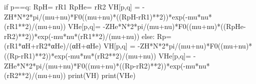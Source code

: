 \documentclass[
  letterpaper,
  DIV=11,
  numbers=noendperiod]{scrreprt}
\newenvironment{Shaded}{\begin{snugshade}}{\end{snugshade}}
\newcommand{\BuiltInTok}[1]{\textcolor[rgb]{0.00,0.23,0.31}{#1}}
\newcommand{\ControlFlowTok}[1]{\textcolor[rgb]{0.00,0.23,0.31}{#1}}
\newcommand{\DecValTok}[1]{\textcolor[rgb]{0.68,0.00,0.00}{#1}}
\newcommand{\NormalTok}[1]{\textcolor[rgb]{0.00,0.23,0.31}{#1}}
\newcommand{\OperatorTok}[1]{\textcolor[rgb]{0.37,0.37,0.37}{#1}}
\begin{document}
\begin{Shaded}
\begin{Highlighting}[]
        \ControlFlowTok{if}\NormalTok{ p}\OperatorTok{==}\NormalTok{q:}
\NormalTok{            RpH}\OperatorTok{=}\NormalTok{ rR1}
\NormalTok{            RpHe}\OperatorTok{=}\NormalTok{ rR2}
\NormalTok{            VH[p,q] }\OperatorTok{=}  \OperatorTok{{-}}\NormalTok{ZH}\OperatorTok{*}\NormalTok{N}\OperatorTok{*}\DecValTok{2}\OperatorTok{*}\NormalTok{pi}\OperatorTok{/}\NormalTok{(mu}\OperatorTok{+}\NormalTok{nu)}\OperatorTok{*}\NormalTok{F0((mu}\OperatorTok{+}\NormalTok{nu)}\OperatorTok{*}\NormalTok{((RpH}\OperatorTok{{-}}\NormalTok{rR1)}\OperatorTok{**}\DecValTok{2}\NormalTok{))}\OperatorTok{*}\NormalTok{exp(}\OperatorTok{{-}}\NormalTok{mu}\OperatorTok{*}\NormalTok{nu}\OperatorTok{*}\NormalTok{(rR1}\OperatorTok{**}\DecValTok{2}\NormalTok{)}\OperatorTok{/}\NormalTok{(mu}\OperatorTok{+}\NormalTok{nu))}
\NormalTok{            VHe[p,q]}\OperatorTok{=} \OperatorTok{{-}}\NormalTok{ZHe}\OperatorTok{*}\NormalTok{N}\OperatorTok{*}\DecValTok{2}\OperatorTok{*}\NormalTok{pi}\OperatorTok{/}\NormalTok{(mu}\OperatorTok{+}\NormalTok{nu)}\OperatorTok{*}\NormalTok{F0((mu}\OperatorTok{+}\NormalTok{nu)}\OperatorTok{*}\NormalTok{((RpHe}\OperatorTok{{-}}\NormalTok{rR2)}\OperatorTok{**}\DecValTok{2}\NormalTok{))}\OperatorTok{*}\NormalTok{exp(}\OperatorTok{{-}}\NormalTok{mu}\OperatorTok{*}\NormalTok{nu}\OperatorTok{*}\NormalTok{(rR1}\OperatorTok{**}\DecValTok{2}\NormalTok{)}\OperatorTok{/}\NormalTok{(mu}\OperatorTok{+}\NormalTok{nu))}
        \ControlFlowTok{else}\NormalTok{:}
\NormalTok{            Rp}\OperatorTok{=}\NormalTok{(rR1}\OperatorTok{*}\NormalTok{αH}\OperatorTok{+}\NormalTok{rR2}\OperatorTok{*}\NormalTok{αHe)}\OperatorTok{/}\NormalTok{(αH}\OperatorTok{+}\NormalTok{αHe)}
\NormalTok{            VH[p,q] }\OperatorTok{=}  \OperatorTok{{-}}\NormalTok{ZH}\OperatorTok{*}\NormalTok{N}\OperatorTok{*}\DecValTok{2}\OperatorTok{*}\NormalTok{pi}\OperatorTok{/}\NormalTok{(mu}\OperatorTok{+}\NormalTok{nu)}\OperatorTok{*}\NormalTok{F0((mu}\OperatorTok{+}\NormalTok{nu)}\OperatorTok{*}\NormalTok{((Rp}\OperatorTok{{-}}\NormalTok{rR1)}\OperatorTok{**}\DecValTok{2}\NormalTok{))}\OperatorTok{*}\NormalTok{exp(}\OperatorTok{{-}}\NormalTok{mu}\OperatorTok{*}\NormalTok{nu}\OperatorTok{*}\NormalTok{(rR2}\OperatorTok{**}\DecValTok{2}\NormalTok{)}\OperatorTok{/}\NormalTok{(mu}\OperatorTok{+}\NormalTok{nu))}
\NormalTok{            VHe[p,q]}\OperatorTok{=} \OperatorTok{{-}}\NormalTok{ZHe}\OperatorTok{*}\NormalTok{N}\OperatorTok{*}\DecValTok{2}\OperatorTok{*}\NormalTok{pi}\OperatorTok{/}\NormalTok{(mu}\OperatorTok{+}\NormalTok{nu)}\OperatorTok{*}\NormalTok{F0((mu}\OperatorTok{+}\NormalTok{nu)}\OperatorTok{*}\NormalTok{((Rp}\OperatorTok{{-}}\NormalTok{rR2)}\OperatorTok{**}\DecValTok{2}\NormalTok{))}\OperatorTok{*}\NormalTok{exp(}\OperatorTok{{-}}\NormalTok{mu}\OperatorTok{*}\NormalTok{nu}\OperatorTok{*}\NormalTok{(rR2}\OperatorTok{**}\DecValTok{2}\NormalTok{)}\OperatorTok{/}\NormalTok{(mu}\OperatorTok{+}\NormalTok{nu))}
\BuiltInTok{print}\NormalTok{(VH)}
\BuiltInTok{print}\NormalTok{(VHe)}
\end{Highlighting}
\end{Shaded}
\end{document}
